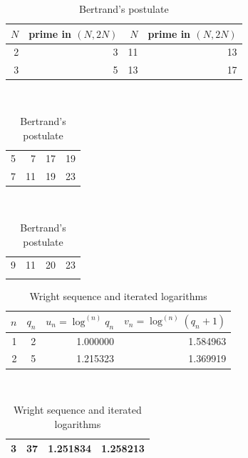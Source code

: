 \documentclass[11pt,reqno]{amsart}
\theoremstyle{blueplain}
\numberwithin{equation}{section}
\begin{document}
{\text{\ } \newline
\text{\ } \vspace{0.3in}\text{\ }
\begin{table}[H]
	\centering
	\caption{Bertrand's postulate}
	
	
	\text{\ } \newline
	\text{\ } \vspace{0.3in}\text{\ }
	
	\begin{tabular}{rr|rr}
		\toprule $N$ & prime in $(N,2N)$ & $N$ & prime in $(N,2N)$ \\ 
		\midrule 2 & 3 & 11 & 13 \\ 
		3 & 5 & 13 & 17 \\ 
		
	\end{tabular}%
	\noindent \hspace{1em}\\[0pt]
	\noindent 
	\begin{tabular}{rr|rr}
		5 & 7 & 17 & 19 \\ 
		7 & 11 & 19 & 23 \\ 
		
	\end{tabular}%
	\noindent \hspace{1em}\\[0pt]
	\noindent 
	\begin{tabular}{rr|rr}
		9 & 11 & 20 & 23 \\ 
		\noindent 
	\end{tabular}
	
\end{table}



\text{\ } \newline
\text{\ } \vspace{0.3in}\text{\ }
\begin{table}[H]
	\centering
	\caption{Wright sequence and iterated logarithms}
	\begin{tabular}{rrrr}
		\toprule $n$ & $q_n$ & $u_n = \log^{(n)} q_n$ & $v_n = \log^{(n)}(q_n+1)$ \\ 
		\midrule 1 & 2 & 1.000000 & 1.584963 \\ 
		2 & 5 & 1.215323 & 1.369919 \\ 
		
	\end{tabular}%
	\noindent \hspace{1em}\\[0pt]
	\noindent 
	\begin{tabular}{rrrr}
		3 & 37 & 1.251834 & 1.258213 \\ 
		\bottomrule 
	\end{tabular}
	
\end{table}
}
\text{\ } \newline
\text{\ } \vspace{0.3in}\text{\ }
\end{document}
